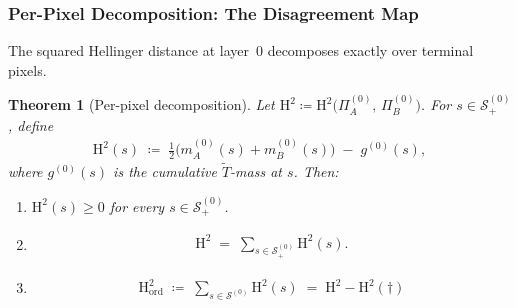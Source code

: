 \documentclass[twoside]{article}
\newcommand{\1}{\mathbf{1}}
\newtheorem{theorem}{Theorem}
\begin{document}
\subsubsection{Per-Pixel Decomposition: The Disagreement Map}\label{sec:lmp-per-pixel}

The squared Hellinger distance at layer~$0$ decomposes exactly over terminal pixels.

\begin{theorem}[Per-pixel decomposition]\label{thm:per-pixel}
Let $\mathrm{H}^2 \coloneqq \mathrm{H}^2\!\bigl(\Pi^{(0)}_A,\, \Pi^{(0)}_B\bigr)$.  For $s \in
    \mathcal{S}^{(0)}_+$, define
\begin{align}\label{eq:per-pixel-h2}
    \mathrm{H}^2(s) \;\coloneqq\; \tfrac{1}{2}\bigl(m^{(0)}_A(s) + m^{(0)}_B(s)\bigr) \;-\; g^{(0)}(s),
\end{align}
where $g^{(0)}(s)$ is the cumulative $\widetilde{T}$-mass at $s$.  Then:
\begin{enumerate}
    \item[(i)] $\mathrm{H}^2(s) \geq 0$ for every $s \in \mathcal{S}^{(0)}_+$.
    \item[(ii)]
        \begin{align}\label{eq:per-pixel-sum}
            \mathrm{H}^2 \;=\; \sum_{s \in \mathcal{S}^{(0)}_+} \mathrm{H}^2(s).
        \end{align}
    \item[(iii)]
        \begin{align}\label{eq:ordinary-h2}
            \mathrm{H}^2_{\mathrm{ord}} \;\coloneqq\; \sum_{s \in \mathcal{S}^{(0)}} \mathrm{H}^2(s) \;=\;
            \mathrm{H}^2 - \mathrm{H}^2(\dagger)
        \end{align}
\end{enumerate}
\end{theorem}
\end{document}
